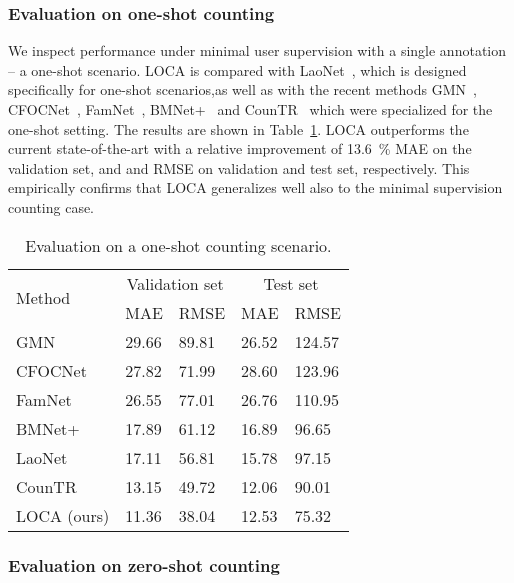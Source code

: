 \documentclass[10pt,twocolumn,letterpaper]{article}
\newcommand*\circledd[1]{\tikz[baseline=(char.base)]{
            \node[shape=circle,draw,inner sep=0.15pt] (char) {#1};}}
\newcommand{\first}[1]{{#1\raisebox{0.8pt}{\footnotesize \color{gold} \circledd{1}}}}
\newcommand{\second}[1]{{#1\raisebox{0.8pt}{\footnotesize \color{silver} \circledd{2}}}}
\newcommand{\third}[1]{{#1\raisebox{0.8pt}{\footnotesize \color{bronze} \circledd{3}}}}
\begin{document}
\subsubsection{Evaluation on one-shot counting}
We inspect performance under minimal user supervision with a single annotation -- a one-shot scenario. LOCA is compared with LaoNet~\cite{laonet}, which is designed specifically for one-shot scenarios,as well as with the recent methods GMN~\cite{gmn}, CFOCNet~\cite{cfocnet}, FamNet~\cite{famnet}, BMNet+~\cite{bmnet} and CounTR~\cite{countr} which were specialized for the one-shot setting.
The results are shown in Table~\ref{tab:results_os}. LOCA outperforms the current state-of-the-art with a relative improvement of 13.6~\% MAE on the validation set, and  and  RMSE on validation and test set, respectively. This empirically confirms that LOCA generalizes well also to the minimal supervision counting case.

\begin{table}[htbp]
    \centering
    \begin{tabular}{l l l l l}\toprule
        \multirow{2}{*}{Method}& \multicolumn{2}{c}{Validation set} & \multicolumn{2}{c}{Test set} \\
        & MAE & RMSE & MAE & RMSE \\ 
        \midrule
        GMN~\cite{gmnclass} & 29.66 & 89.81 & 26.52 & 124.57 \\
        CFOCNet~\cite{cfocnet} & 27.82 & 71.99 & 28.60 & 123.96 \\ FamNet~\cite{famnet} & 26.55 & 77.01 & 26.76 & 110.95 \\
        BMNet+~\cite{bmnet} & 17.89 & 61.12 & 16.89 & \third{96.65} \\
        LaoNet~\cite{laonet}& \third{17.11} & \third{56.81} & \third{15.78} & 97.15 \\
        CounTR~\cite{countr}& \second{13.15} & \second{49.72} & \first{12.06} & \second{90.01} \\
        LOCA (ours) & \first{11.36} & \first{38.04} & \second{12.53} & \first{75.32} \\
        \bottomrule
    \end{tabular}
    \caption{Evaluation on a one-shot counting scenario.}
    \label{tab:results_os}
\end{table}

\subsubsection{Evaluation on zero-shot counting}
\end{document}
